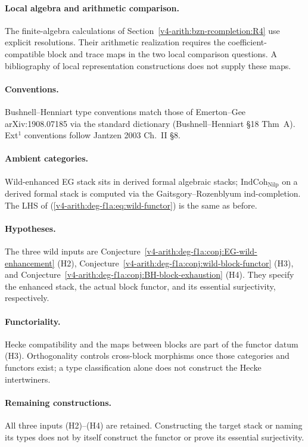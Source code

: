 \paragraph{Local algebra and arithmetic comparison.}
The finite-algebra calculations of
Section~\ref{v4-arith:bzn-rcompletion:R4} use explicit resolutions.
Their arithmetic realization requires the coefficient-compatible
block and trace maps in the two local comparison questions.
A bibliography of local representation constructions does not
supply these maps.

\paragraph{Conventions.} Bushnell--Henniart type
conventions match those of Emerton--Gee arXiv:1908.07185 via the
standard dictionary (Bushnell--Henniart \S 18 Thm~A). Ext\({}^{1}\)
conventions follow Jantzen 2003 Ch.~II \S 8.

\paragraph{Ambient categories.} Wild-enhanced EG stack
sits in derived formal algebraic stacks; \(\mathrm{IndCoh}_{\mathrm{Nilp}}\)
on a derived formal stack is computed via the Gaitsgory--Rozenblyum
ind-completion. The LHS of
(\ref{v4-arith:deg-f1a:eq:wild-functor}) is the same as before.

\paragraph{Hypotheses.} The three wild inputs are
Conjecture~\ref{v4-arith:deg-f1a:conj:EG-wild-enhancement} (H2),
Conjecture~\ref{v4-arith:deg-f1a:conj:wild-block-functor} (H3), and
Conjecture~\ref{v4-arith:deg-f1a:conj:BH-block-exhaustion} (H4).
They specify the enhanced stack, the actual block functor, and its
essential surjectivity, respectively.

\paragraph{Functoriality.} Hecke compatibility and the maps between
blocks are part of the functor datum (H3). Orthogonality controls
cross-block morphisms once those categories and functors exist;
a type classification alone does not construct the Hecke intertwiners.

\paragraph{Remaining constructions.} All three inputs (H2)--(H4)
are retained. Constructing the target stack or naming its types does
not by itself construct the functor or prove its essential surjectivity.


